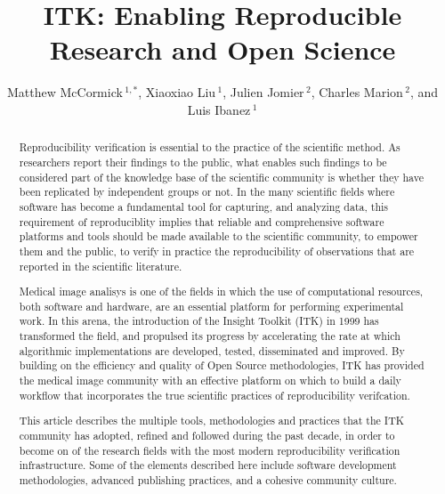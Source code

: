 \documentclass{frontiersENG} %
\def\firstAuthorLast{McCormick {et~al.}} %
\def\Authors{Matthew McCormick\,$^{1,*}$,
  Xiaoxiao Liu\,$^{1}$,
  Julien Jomier\,$^{2}$,
  Charles Marion\,$^{2}$,
  and Luis Ibanez\,$^1$}
\begin{document}
\onecolumn
{}

\title[ITK Reproducible Research]{ITK: Enabling Reproducible Research and Open Science}
\author[\firstAuthorLast ]{\Authors}
\address{}
\correspondance{}
\extraAuth{}%

\maketitle
\begin{abstract}

Reproducibility verification is essential to the practice of the scientific
method. As researchers report their findings to the public, what enables such
findings to be considered part of the knowledge base of the scientific
community is whether they have been replicated by independent groups or not. In
the many scientific fields where software has become a fundamental tool for
capturing, and analyzing data, this requirement of reproduciblity implies that
reliable and comprehensive software platforms and tools should be made
available to the scientific community, to empower them and the public, to verify
in practice the reproducibility of observations that are reported in the
scientific literature.

Medical image analisys is one of the fields in which the use of computational
resources, both software and hardware, are an essential platform for performing
experimental work. In this arena, the introduction of the Insight Toolkit (ITK)
in 1999 has transformed the field, and propulsed its progress by accelerating
the rate at which algorithmic implementations are developed, tested,
disseminated and improved. By building on the efficiency and quality of Open
Source methodologies, ITK has provided the medical image community with an
effective platform on which to build a daily workflow that incorporates the
true scientific practices of reproducibility verifcation.

This article describes the multiple tools, methodologies and practices that the
ITK community has adopted, refined and followed during the past decade, in
order to become on of the research fields with the most modern reproducibility
verification infrastructure. Some of the elements described here include
software development methodologies, advanced publishing practices, and a
cohesive community culture.


\end{abstract}
\end{document}
